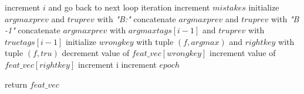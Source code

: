 \documentclass[11pt]{article}
\begin{document}
\begin{algorithm}[htb]
\begin{algorithmic}[1]
		        \STATE increment $i$ and go back to next loop iteration
		      \ELSE
		        \STATE increment $mistakes$		      
		      \ENDIF
		      \STATE initialize $argmaxprev$ and $truprev$ with \textit{"B:"}
		        \STATE concatenate $argmaxprev$ and $truprev$ with \textit{"B -1"}
		      \ELSE
		        \STATE concatenate $argmaxprev$ with $argmaxtags[i-1]$ and $truprev$ with $truetags[i-1]$
		      \ENDIF
		      \STATE initialize $wrongkey$ with tuple $(f, argmax)$ and $rightkey$ with tuple $(f, tru)$
		      \STATE decrement value of $feat\_vec[wrongkey]$
		      \STATE increment value of $feat\_vec[rightkey]$
		      \STATE increment i
		    \ENDFOR
		  \ENDFOR
		  \STATE increment $epoch$
		\ENDWHILE
		
		\STATE return $feat\_vec$
	\end{algorithmic}
\end{algorithm}
\end{document}
